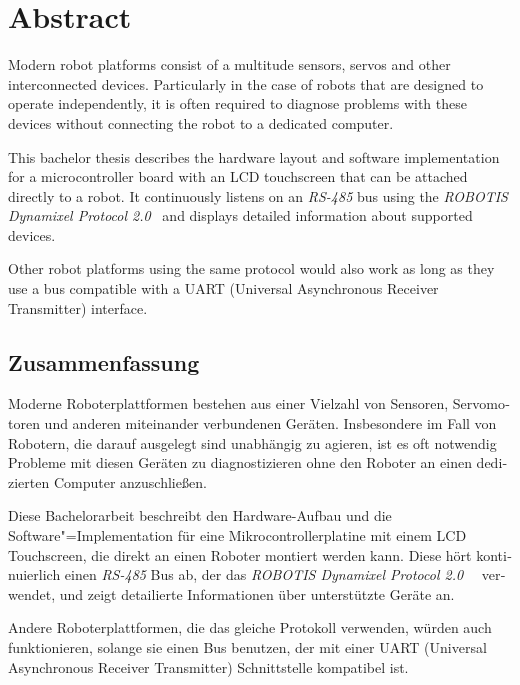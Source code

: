 \section*{Abstract}
\label{abstract}

Modern robot platforms consist of a multitude sensors, servos and other interconnected devices.
Particularly in the case of robots that are designed to operate independently, it is often required
to diagnose problems with these devices without connecting the robot to a dedicated computer.

This bachelor thesis describes the hardware layout and software implementation for a microcontroller
board with an LCD touchscreen that can be attached directly to a robot. It continuously listens on
an \textit{RS-485} bus using the \textit{ROBOTIS Dynamixel Protocol 2.0}~\cite{dynamixel-protocol-2}
and displays detailed information about supported devices.

Other robot platforms using the same protocol would also work as long as they use a bus compatible
with a UART (Universal Asynchronous Receiver Transmitter) interface.

\begin{otherlanguage}{ngerman}
\vfill
\section*{Zusammenfassung}
\label{zusammenfassung}

Moderne Roboterplattformen bestehen aus einer Vielzahl von Sensoren, Servomotoren und anderen
miteinander verbundenen Geräten. Insbesondere im Fall von Robotern, die darauf ausgelegt sind
unabhängig zu agieren, ist es oft notwendig Probleme mit diesen Geräten zu diagnostizieren ohne den
Roboter an einen dedizierten Computer anzuschließen.

Diese Bachelorarbeit beschreibt den Hardware-Aufbau und die Software"=Implementation für eine
Mikrocontrollerplatine mit einem LCD Touchscreen, die direkt an einen Roboter montiert werden kann.
Diese hört kontinuierlich einen \textit{RS-485} Bus ab, der das \textit{ROBOTIS Dynamixel Protocol 2.0}~\
\cite{dynamixel-protocol-2} verwendet, und zeigt detailierte Informationen über unterstützte Geräte an.

Andere Roboterplattformen, die das gleiche Protokoll verwenden, würden auch funktionieren, solange
sie einen Bus benutzen, der mit einer UART (Universal Asynchronous Receiver Transmitter) Schnittstelle
kompatibel ist.

\end{otherlanguage}
